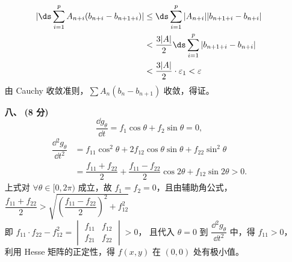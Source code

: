 \documentclass{ctexart}
\begin{document}
\begin{enumerate}
    \begin{align*}
    |\ds\sum_{i=1}^pA_{n+i}(b_{n+i}-b_{n+1+i})|
    &\le\ds\sum_{i=1}^p|A_{n+i}||b_{n+1+i}-b_{n+i}| \\
    &<\dfrac{3|A|}{2}\ds\sum_{i=1}^p|b_{n+1+i}-b_{n+i}| \\
    &<\dfrac{3|A|}{2}\cdot\varepsilon_1<\varepsilon
    \end{align*}
    由 Cauchy 收敛准则，$\sum A_n(b_n-b_{n+1})$ 收敛，得证。
    \item[\textbf{八、}] \textbf{(8 分)} $$ \dfrac{\dd{g_{\theta}}}{\dd{t}}=f_1\cos\theta+f_2\sin\theta=0, $$
    \begin{align*} 
    \dfrac{\dd{^2g_{\theta}}}{\dd{t^2}}&=f_{11}\cos^2\theta+2f_{12}\cos\theta\sin\theta+f_{22}\sin^2\theta \\
    &=\dfrac{f_{11}+f_{22}}{2}+\dfrac{f_{11}-f_{22}}{2}\cos 2\theta+f_{12}\sin 2\theta > 0.
    \end{align*}
    上式对 $\forall\theta\in [0,2\pi)$ 成立，故 $f_1=f_2=0$，且由辅助角公式，$\dfrac{f_{11}+f_{22}}{2}>\sqrt{(\dfrac{f_{11}-f_{22}}{2})^2+f_{12}^2}$ \\
    即 $f_{11}\cdot f_{22}-f_{12}^2=\begin{vmatrix} f_{11} & f_{12} \\ f_{21} & f_{22}\end{vmatrix}>0$，
    且代入 $\theta=0$ 到 $\dfrac{\dd{^2g_{\theta}}}{\dd{t^2}}$ 中，得 $f_{11}>0$， \\
    利用 Hesse 矩阵的正定性，得 $f(x,y)$ 在 $(0,0)$ 处有极小值。
\end{enumerate}
\end{document}
